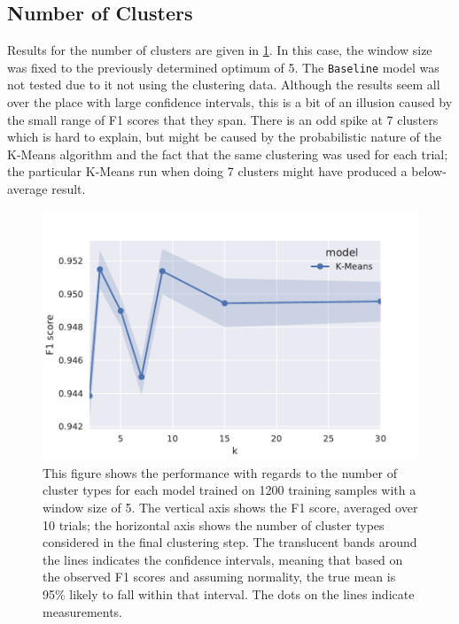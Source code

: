 \subsection{Number of Clusters}
Results for the number of clusters are given in \cref{fig:numcluster}. In
this case, the window size was fixed to the previously determined optimum of 5.
The \texttt{Baseline} model was not tested due to it not using the clustering
data.  Although the results seem all over the place with large confidence
intervals, this is a bit of an illusion caused by the small range of F1 scores
that they span. There is an odd spike at 7 clusters which is hard to explain,
but might be caused by the probabilistic nature of the K-Means algorithm and the
fact that the same clustering was used for each trial; the particular K-Means
run when doing 7 clusters might have produced a below-average result.
\begin{figure}[tb]
  \centering
  \includegraphics[width=\textwidth]{figures/results/800-numcluster/tseries_f1.pdf}
  \caption{This figure shows the performance with regards to the number of
    cluster types for each model trained on 1200 training samples with a window
    size of 5.  The vertical axis shows the F1 score, averaged over 10 trials;
    the horizontal axis shows the number of cluster types considered in the
    final clustering step.  The translucent bands around the lines indicates the
    confidence intervals, meaning that based on the observed F1 scores and
    assuming normality, the true mean is 95\% likely to fall within that interval.
    The dots on the lines indicate measurements.\label{fig:numcluster}}
\end{figure}

